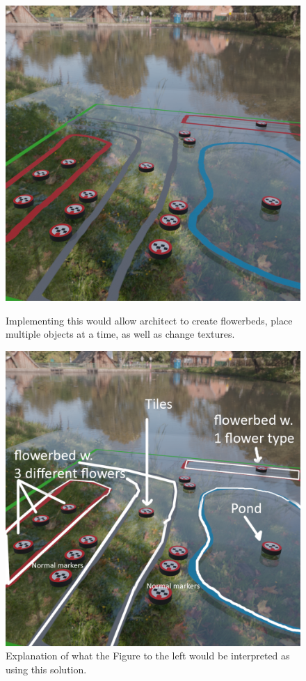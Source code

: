 \begin{figure}[H]
	\centering
	\begin{minipage}[b]{0.49\textwidth}
		\includegraphics[width=1.0\linewidth]{figure/Evaluation/futuremarkers.png}
		\caption{Implementing this would allow architect to create flowerbeds, place multiple objects at a time, as well as change textures.}
		\label{fig:ftemarkers}
	\end{minipage}
	\hfill
	\begin{minipage}[b]{0.49\textwidth}
		\includegraphics[width=1.0\linewidth]{figure/Evaluation/futuremarkerslegend.png}
		\caption{Explanation of what the Figure to the left would be interpreted as using this solution.}
		\label{fig:ftrmarkerslegend}
	\end{minipage}
\end{figure}

